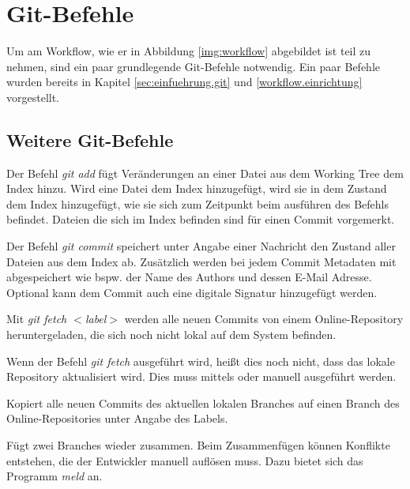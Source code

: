 \section{Git-Befehle}
\label{git-commands}

Um am Workflow, wie er in Abbildung \ref{img:workflow} abgebildet ist teil zu nehmen, sind ein paar grundlegende Git-Befehle notwendig. Ein paar Befehle wurden bereits in Kapitel \ref{sec:einfuehrung.git} und \ref{workflow.einrichtung} vorgestellt.

\subsection{Weitere Git-Befehle}
\label{git-commands.advanced}

\label{git-commands.advanced.add}
Der Befehl \textit{git add} fügt Veränderungen an einer Datei aus dem Working Tree dem Index hinzu. Wird eine Datei dem Index hinzugefügt, wird sie in dem Zustand dem Index hinzugefügt, wie sie sich zum Zeitpunkt beim ausführen des Befehls befindet. Dateien die sich im Index befinden sind für einen Commit vorgemerkt. 

\label{git-commands.advanced.commit}
Der Befehl \textit{git commit} speichert unter Angabe einer Nachricht den Zustand aller Dateien aus dem Index ab. Zusätzlich werden bei jedem Commit Metadaten mit abgespeichert wie bspw. der Name des Authors und dessen E-Mail Adresse. Optional kann dem Commit auch eine digitale Signatur hinzugefügt werden.

\label{git-commands.advanced.fetch}
Mit \textit{git fetch $ < $label$ > $} werden alle neuen Commits von einem Online-Repository heruntergeladen, die sich noch nicht lokal auf dem System befinden.

\begin{INFO}
  Wenn der Befehl \textit{git fetch} ausgeführt wird, heißt dies noch nicht, dass das lokale Repository aktualisiert wird. Dies muss mittels \textit{} oder \textit{} manuell ausgeführt werden.
\end{INFO}

\label{git-commands.advanced.push}
Kopiert alle neuen Commits des aktuellen lokalen Branches auf einen Branch des Online-Repositories unter Angabe des Labels.

\label{git-commands.advanced.merge}
Fügt zwei Branches wieder zusammen. Beim Zusammenfügen können Konflikte entstehen, die der Entwickler manuell auflösen muss. Dazu bietet sich das Programm \textit{meld} an.

